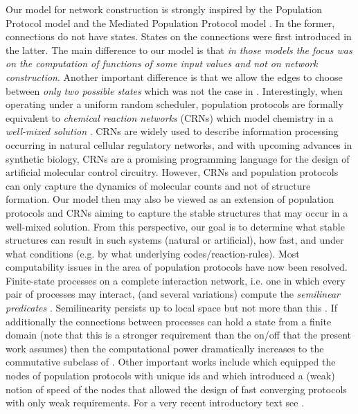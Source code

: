 \documentclass[oribibl, 11pt]{llncs}
\begin{document}
Our model for network construction is strongly inspired by the Population Protocol model \cite{AADFP06} and the Mediated Population Protocol model \cite{MCS11-2}. In the former, connections do not have states. States on the connections were first introduced in the latter. The main difference to our model is that \emph{in those models the focus was on the computation of functions of some input values and not on network construction}. Another important difference is that we allow the edges to choose between \emph{only two possible states} which was not the case in \cite{MCS11-2}. Interestingly, when operating under a uniform random scheduler, population protocols are formally equivalent to \emph{chemical reaction networks} (CRNs) which model chemistry in a \emph{well-mixed solution} \cite{Do14}. CRNs are widely used to describe information processing occurring in natural cellular regulatory networks, and with upcoming advances in synthetic biology, CRNs are a promising programming language for the design of artificial molecular control circuitry. However, CRNs and population protocols can only capture the dynamics of molecular counts and not of structure formation. Our model then may also be viewed as an extension of population protocols and CRNs aiming to capture the stable structures that may occur in a well-mixed solution. From this perspective, our goal is to determine what stable structures can result in such systems (natural or artificial), how fast, and under what conditions (e.g. by what underlying codes/reaction-rules). Most computability issues in the area of population protocols have now been resolved. Finite-state processes on a complete interaction network, i.e. one in which every pair of processes may interact, (and several variations) compute the \emph{semilinear predicates} \cite{AAER07}. Semilinearity persists up to  local space but not more than this \cite{MNPS11}.  If additionally the connections between processes can hold a state from a finite domain (note that this is a stronger requirement than the on/off that the present work assumes) then the computational power dramatically increases to the commutative subclass of  \cite{MCS11-2}. Other important works include \cite{GR09} which equipped the nodes of population protocols with unique ids and \cite{BBCK10} which introduced a (weak) notion of speed of the nodes that allowed the design of fast converging protocols with only weak requirements. For a very recent introductory text see \cite{MCS11}.
\end{document}
